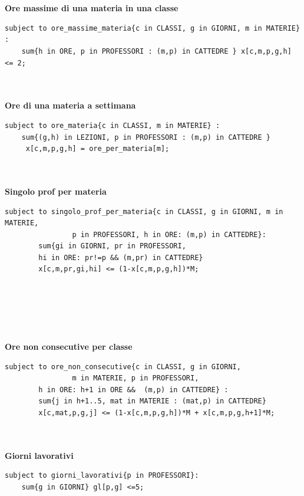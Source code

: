 \documentclass{article}
\begin{document}
\\\\\textbf{Ore massime di una materia in una classe}
\begin{verbatim}
subject to ore_massime_materia{c in CLASSI, g in GIORNI, m in MATERIE} :
	sum{h in ORE, p in PROFESSORI : (m,p) in CATTEDRE } x[c,m,p,g,h] <= 2;
\end{verbatim}
\\\\\textbf{Ore di una materia a settimana}
\begin{verbatim}
subject to ore_materia{c in CLASSI, m in MATERIE} :
	sum{(g,h) in LEZIONI, p in PROFESSORI : (m,p) in CATTEDRE }
	 x[c,m,p,g,h] = ore_per_materia[m];
\end{verbatim}
\\\\\textbf{Singolo prof per materia}
\begin{verbatim}
subject to singolo_prof_per_materia{c in CLASSI, g in GIORNI, m in MATERIE, 
                p in PROFESSORI, h in ORE: (m,p) in CATTEDRE}:
		sum{gi in GIORNI, pr in PROFESSORI, 
		hi in ORE: pr!=p && (m,pr) in CATTEDRE}
		x[c,m,pr,gi,hi] <= (1-x[c,m,p,g,h])*M;
\end{verbatim}
\\\\\\\\\\\textbf{Ore non consecutive per classe}
\begin{verbatim}
subject to ore_non_consecutive{c in CLASSI, g in GIORNI,
                m in MATERIE, p in PROFESSORI, 
		h in ORE: h+1 in ORE &&  (m,p) in CATTEDRE} :
		sum{j in h+1..5, mat in MATERIE : (mat,p) in CATTEDRE} 
		x[c,mat,p,g,j] <= (1-x[c,m,p,g,h])*M + x[c,m,p,g,h+1]*M;
\end{verbatim}
\\\\\textbf{Giorni lavorativi}
\begin{verbatim}
subject to giorni_lavorativi{p in PROFESSORI}:
	sum{g in GIORNI} gl[p,g] <=5;
\end{verbatim}
\end{document}

